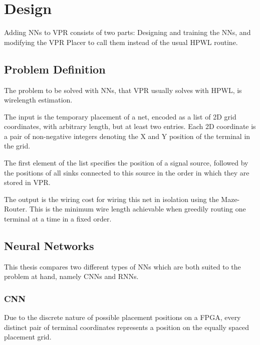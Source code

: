 
\chapter{Design}\label{ch:design}
\glsresetall %

Adding \glspl{NN} to \gls{VPR} consists of two parts: Designing and training the \glspl{NN}, and modifying the \gls{VPR} Placer to call them instead of the usual \gls{HPWL} routine.

\section{Problem Definition}

The problem to be solved with \glspl{NN}, that \gls{VPR} usually solves with \gls{HPWL}, is wirelength estimation.

The input is the temporary placement of a net, encoded as a list of 2D grid coordinates, with arbitrary length, but at least two entries. Each 2D coordinate is a pair of non-negative integers denoting the X and Y position of the terminal in the grid. 

The first element of the list specifies the position of a signal source, followed by the positions of all sinks connected to this source in the order in which they are stored in \gls{VPR}.

The output is the wiring cost for wiring this net in isolation using the Maze-Router. This is the minimum wire length achievable when greedily routing one terminal at a time in a fixed order.

\section{Neural Networks}

This thesis compares two different types of \glspl{NN} which are both suited to the problem at hand, namely \glspl{CNN} and \glspl{RNN}.

\subsection{\gls{CNN}}

Due to the discrete nature of possible placement positions on a \gls{FPGA}, every distinct pair of terminal coordinates represents a position on the equally spaced placement grid. 

